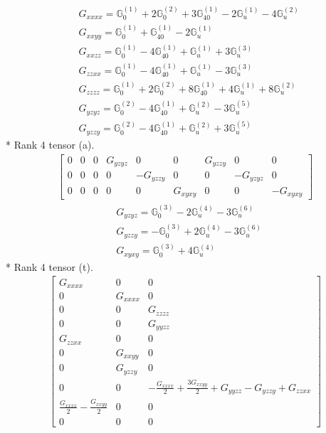 \documentclass[fleqn,8pt,landscape]{jsarticle}
\begin{document}
\begin{align*}
& G_{xxxx} = \mathbb{G}_{0}^{(1)} + 2 \mathbb{G}_{0}^{(2)} + 3 \mathbb{G}_{40}^{(1)} - 2 \mathbb{G}_{u}^{(1)} - 4 \mathbb{G}_{u}^{(2)} \\
& G_{xxyy} = \mathbb{G}_{0}^{(1)} + \mathbb{G}_{40}^{(1)} - 2 \mathbb{G}_{u}^{(1)} \\
& G_{xxzz} = \mathbb{G}_{0}^{(1)} - 4 \mathbb{G}_{40}^{(1)} + \mathbb{G}_{u}^{(1)} + 3 \mathbb{G}_{u}^{(3)} \\
& G_{zzxx} = \mathbb{G}_{0}^{(1)} - 4 \mathbb{G}_{40}^{(1)} + \mathbb{G}_{u}^{(1)} - 3 \mathbb{G}_{u}^{(3)} \\
& G_{zzzz} = \mathbb{G}_{0}^{(1)} + 2 \mathbb{G}_{0}^{(2)} + 8 \mathbb{G}_{40}^{(1)} + 4 \mathbb{G}_{u}^{(1)} + 8 \mathbb{G}_{u}^{(2)} \\
& G_{yzyz} = \mathbb{G}_{0}^{(2)} - 4 \mathbb{G}_{40}^{(1)} + \mathbb{G}_{u}^{(2)} - 3 \mathbb{G}_{u}^{(5)} \\
& G_{yzzy} = \mathbb{G}_{0}^{(2)} - 4 \mathbb{G}_{40}^{(1)} + \mathbb{G}_{u}^{(2)} + 3 \mathbb{G}_{u}^{(5)}
\end{align*}
* Rank 4 tensor (a).
\begin{align*}
\begin{bmatrix} 0 & 0 & 0 & G_{yzyz} & 0 & 0 & G_{yzzy} & 0 & 0 \\ 0 & 0 & 0 & 0 & - G_{yzzy} & 0 & 0 & - G_{yzyz} & 0 \\ 0 & 0 & 0 & 0 & 0 & G_{xyxy} & 0 & 0 & - G_{xyxy} \end{bmatrix}
\end{align*}
\begin{align*}
& G_{yzyz} = \mathbb{G}_{0}^{(3)} - 2 \mathbb{G}_{u}^{(4)} - 3 \mathbb{G}_{u}^{(6)} \\
& G_{yzzy} = - \mathbb{G}_{0}^{(3)} + 2 \mathbb{G}_{u}^{(4)} - 3 \mathbb{G}_{u}^{(6)} \\
& G_{xyxy} = \mathbb{G}_{0}^{(3)} + 4 \mathbb{G}_{u}^{(4)}
\end{align*}
* Rank 4 tensor (t).
\begin{align*}
\begin{bmatrix} G_{xxxx} & 0 & 0 \\ 0 & G_{xxxx} & 0 \\ 0 & 0 & G_{zzzz} \\ 0 & 0 & G_{yyzz} \\ G_{zzxx} & 0 & 0 \\ 0 & G_{xxyy} & 0 \\ 0 & G_{yzzy} & 0 \\ 0 & 0 & - \frac{G_{xxxx}}{2} + \frac{3 G_{xxyy}}{2} + G_{yyzz} - G_{yzzy} + G_{zzxx} \\ \frac{G_{xxxx}}{2} - \frac{G_{xxyy}}{2} & 0 & 0 \\ 0 & 0 & 0 \end{bmatrix}
\end{align*}
\end{document}
